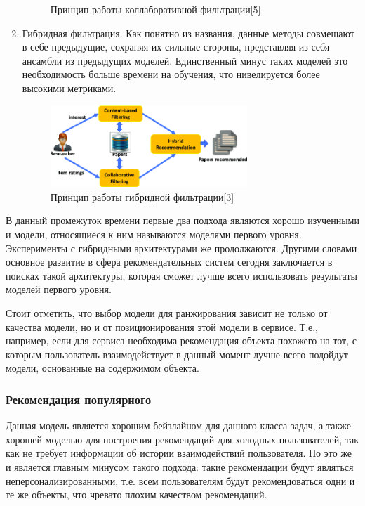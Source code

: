 \documentclass[bachelor, och, coursework]{SCWorks}
\begin{document}
\begin{enumerate}
\begin{figure}[H]
        \caption{Принцип работы коллаборативной фильтрации[5]}
        \label{fig:img1}
    \end{figure}
    \item Гибридная фильтрация. Как понятно из названия, данные методы совмещают в себе предыдущие, сохраняя их сильные
    стороны, представляя из себя ансамбли из предыдущих моделей. Единственный минус таких моделей это необходимость 
    больше времени на обучения, что нивелируется более высокими метриками.
    \begin{figure}[H]
        \centering
        \includegraphics[width=0.7\textwidth]{pic/3}
        \caption{Принцип работы гибридной фильтрации[3]}
        \label{fig:img1}
    \end{figure}
\end{enumerate}

В данный промежуток времени первые два подхода являются хорошо изученными и модели, относящиеся к ним называются
моделями первого уровня. Эксперименты с гибридными архитектурами же продолжаются. Другими словами основное развитие
в сфера рекомендательных систем сегодня заключается в поисках такой архитектуры, которая сможет лучше всего использовать
результаты моделей первого уровня.

Стоит отметить, что выбор модели для ранжирования зависит не только от качества модели, но и от позиционирования
этой модели в сервисе. Т.е., например, если для сервиса необходима рекомендация объекта похожего на тот, с которым пользователь
взаимодействует в данный момент лучше всего подойдут модели, основанные на содержимом объекта.
\subsubsection{Рекомендация популярного}
Данная модель является хорошим бейзлайном для данного класса задач, а также хорошей моделью для построения
рекомендаций для холодных пользователей, так как не требует информации об истории взаимодействий пользователя.
Но это же и является главным минусом такого подхода: такие рекомендации будут являться неперсонализированными,
т.е. всем пользователям будут рекомендоваться одни и те же объекты, что чревато плохим качеством рекомендаций.
\end{document}
